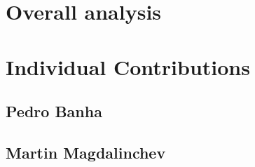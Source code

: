 \documentclass[sigconf]{acmart}
\begin{document}
\section{Overall analysis}

\section{Individual Contributions}
\subsection{Pedro Banha}
\subsection{Martin Magdalinchev}




\end{document}
